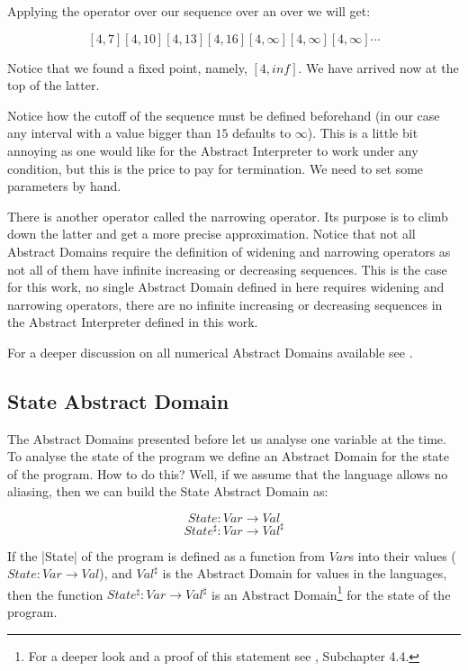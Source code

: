 Applying the operator over our sequence over an over we will get:

\[[4,7] [4,10] [4,13] [4,16] [4,\infty] [4,\infty] [4,\infty] \cdots\]

Notice that we found a fixed point, namely, $[4,inf]$. We have arrived now at the top of
the latter.

Notice how the cutoff of the sequence must be defined beforehand (in our case any interval
with a value bigger than \(15\) defaults to \(\infty\)). This is a little bit annoying as
one would like for the Abstract Interpreter to work under any condition, but this is the
price to pay for termination. We need to set some parameters by hand.

There is another operator called the narrowing operator. Its purpose is to climb down the
latter and get a more precise approximation. Notice that not all Abstract Domains require
the definition of widening and narrowing operators as not all of them have infinite
increasing or decreasing sequences. This is the case for this work, no single Abstract
Domain defined in here requires widening and narrowing operators, there are no infinite
increasing or decreasing sequences in the Abstract Interpreter defined in this work.

For a deeper discussion on all numerical Abstract Domains available see
\textcite{mine_weakly_2004}.

\subsection{State Abstract Domain}\label{state-abstract-domain}

The Abstract Domains presented before let us analyse one variable at
the time. To analyse the state of the program we define an Abstract
Domain for the state of the program. How to do this? Well, if we assume
that the language allows no aliasing, then we can build the State
Abstract Domain as:

\[State: Var \to Val\]
\[State^\sharp: Var \to Val^\sharp\]

If the \pycode|State| of the program is defined as a function from \(Var\)s into their
values (\(State: Var \to Val\)), and \(Val^\sharp\) is the Abstract Domain for values in
the languages, then the function \(State^\sharp: Var \to Val^\sharp\) is an Abstract
Domain\footnote{For a deeper look and a proof of this statement see
  \textcite{nielson2015principles}, Subchapter 4.4.} for the state of the program.

